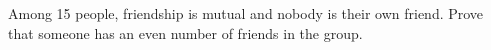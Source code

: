 Among 15 people, friendship is mutual and nobody is their own friend. Prove that someone has an even number of friends in the group.
